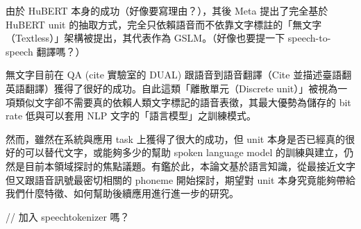 由於 HuBERT 本身的成功（好像要寫理由？），其後 Meta 提出了完全基於 HuBERT unit 的抽取方式，完全只依賴語音而不依靠文字標註的「無文字（Textless）」架構被提出，其代表作為 GSLM。（好像也要提一下 speech-to-speech 翻譯嗎？）

無文字目前在 QA (cite 實驗室的 DUAL) 跟語音到語音翻譯（Cite 並描述臺語翻英語翻譯）獲得了很好的成功。自此這類「離散單元（Discrete unit）」被視為一項類似文字卻不需要真的依賴人類文字標記的語音表徵，其最大優勢為儲存的 bit rate 低與可以套用 NLP 文字的「語言模型」之訓練模式。

然而，雖然在系統與應用 task 上獲得了很大的成功，但 unit 本身是否已經真的很好的可以替代文字，或能夠多少的幫助 spoken language model 的訓練與建立，仍然是目前本領域探討的焦點議題。有鑑於此，本論文基於語言知識，從最接近文字但又跟語音訊號最密切相關的 phoneme 開始探討，期望對 unit 本身究竟能夠帶給我們什麼特徵、如何幫助後續應用進行進一步的研究。

// 加入 speechtokenizer 嗎？


\cite{dummy}
